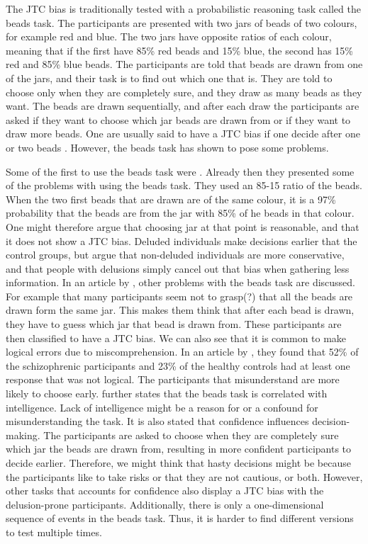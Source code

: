 The JTC bias is traditionally tested with a probabilistic reasoning task called the beads task. The participants are presented with two jars of beads of two colours, for example red and blue. The two jars have opposite ratios of each colour, meaning that if the first have 85\% red beads and 15\% blue, the second has 15\% red and 85\% blue beads. The participants are told that beads are drawn from one of the jars, and their task is to find out which one that is. They are told to choose only when they are completely sure, and they draw as many beads as they want. The beads are drawn sequentially, and after each draw the participants are asked if they want to choose which jar beads are drawn from or if they want to draw more beads. One are usually said to have a JTC bias if one decide after one or two beads \citep{moritz2017}. However, the beads task has shown to pose some problems.

Some of the first to use the beads task were \citet{huq1988}. Already then they presented some of the problems with using the beads task. They used an 85-15 ratio of the beads. When the two first beads that are drawn are of the same colour, it is a 97\% probability that the beads are from the jar with 85\% of he beads in that colour. One might therefore argue that choosing jar at that point is reasonable, and that it does not show a JTC bias. Deluded individuals make decisions earlier that the control groups, but \citeauthor{huq1988} argue that non-deluded individuals are more conservative, and that people with delusions simply cancel out that bias when gathering less information. In an article by \citet{moritz2017}, other problems with the beads task are discussed. For example that many participants seem not to grasp(?) that all the beads are drawn form the same jar. This makes them think that after each bead is drawn, they have to guess which jar that bead is drawn from. These participants are then classified to have a JTC bias. We can also see that it is common to make logical errors due to miscomprehension. In an article by \citet{moritz2005}, they found that 52\% of the schizophrenic participants and 23\% of the healthy controls had at least one response that was not logical. The participants that misunderstand are more likely to choose early. \citeauthor{moritz2017} further states that the beads task is correlated with intelligence. Lack of intelligence might be a reason for or a confound for misunderstanding the task. It is also stated that confidence influences decision-making. The participants are asked to choose when they are completely sure which jar the beads are drawn from, resulting in more confident participants to decide earlier. Therefore, we might think that hasty decisions might be because the participants like to take risks or that they are not cautious, or both. However, other tasks that accounts for confidence also display a JTC bias with the delusion-prone participants. Additionally, there is only a one-dimensional sequence of events in the beads task. Thus, it is harder to find different versions to test multiple times. 

